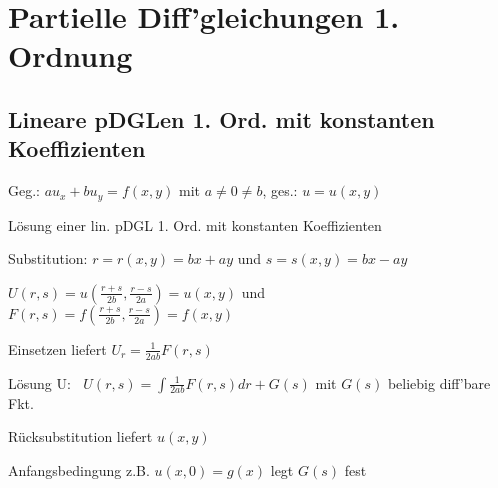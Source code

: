 \documentclass[german,color,6pt]{latex4ei/latex4ei_fs}
\begin{document}
\section{Partielle Diff'gleichungen 1. Ordnung}

\begin{sectionbox}
	\subsection{Lineare pDGLen 1. Ord. mit konstanten Koeffizienten}
	Geg.: $a u_x+b u_y =f(x,y)$ mit $a \neq 0 \neq b$, ges.: $u=u(x,y)$
	\begin{cookbox}{Lösung einer lin. pDGL 1. Ord. mit konstanten Koeffizienten}
		\item Substitution: $r=r(x,y)=bx+ay$ und $s=s(x,y)=bx-ay$
		\item $U(r,s) = u(\frac{r+s}{2b},\frac{r-s}{2a}) = u(x,y)$  und \\ $F(r,s) = f(\frac{r+s}{2b},\frac{r-s}{2a}) = f(x,y)$
		\item Einsetzen liefert $U_{r}=\frac{1}{2ab}F(r,s) $
		\item Lösung U: $\; \; U(r,s)=\int \frac{1}{2ab} F(r,s)dr+G(s)$ mit $G(s)$ beliebig diff'bare Fkt.
		\item Rücksubstitution liefert $u(x,y)$
		\item Anfangsbedingung z.B. $u(x,0) = g(x)$ legt $G(s)$ fest
	\end{cookbox}
\end{sectionbox}
\end{document}

